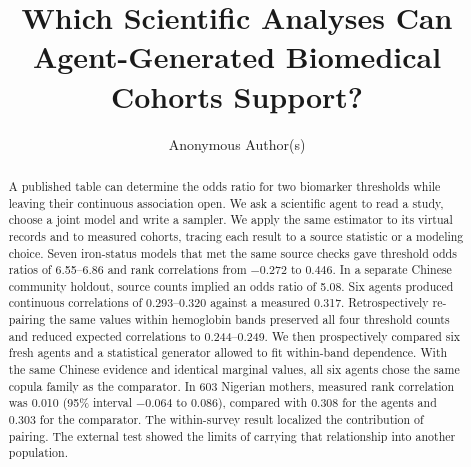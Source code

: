 \documentclass[sigconf,anonymous,review]{acmart}
\begin{document}
\title[Which Analyses Can Agent-Generated Cohorts Support?]{Which Scientific Analyses Can Agent-Gener\-ated Biomedical Cohorts Support?}
\author{Anonymous Author(s)}

\begin{abstract}
A published table can determine the odds ratio for two biomarker thresholds while leaving their continuous association open. We ask a scientific agent to read a study, choose a joint model and write a sampler. We apply the same estimator to its virtual records and to measured cohorts, tracing each result to a source statistic or a modeling choice. Seven iron-status models that met the same source checks gave threshold odds ratios of 6.55--6.86 and rank correlations from $-0.272$ to $0.446$. In a separate Chinese community holdout, source counts implied an odds ratio of 5.08. Six agents produced continuous correlations of 0.293--0.320 against a measured 0.317. Retrospectively re-pairing the same values within hemoglobin bands preserved all four threshold counts and reduced expected correlations to 0.244--0.249. We then prospectively compared six fresh agents and a statistical generator allowed to fit within-band dependence. With the same Chinese evidence and identical marginal values, all six agents chose the same copula family as the comparator. In 603 Nigerian mothers, measured rank correlation was 0.010 (95\% interval $-0.064$ to 0.086), compared with 0.308 for the agents and 0.303 for the comparator. The within-survey result localized the contribution of pairing. The external test showed the limits of carrying that relationship into another population.
\end{abstract}

\maketitle
\end{document}
